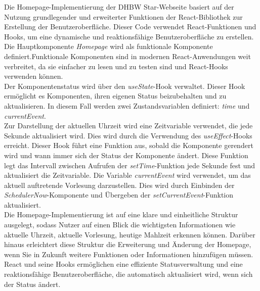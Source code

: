 Die Homepage-Implementierung der DHBW Star-Webseite basiert auf der Nutzung grundlegender und erweiterter Funktionen der React-Bibliothek zur Erstellung der Benutzeroberfläche. Dieser Code verwendet React-Funktionen und Hooks, um eine dynamische und reaktionsfähige Benutzeroberfläche zu erstellen.\\ 
Die Hauptkomponente \emph{Homepage} wird als funktionale Komponente definiert.Funktionale Komponenten sind in modernen React-Anwendungen weit verbreitet, da sie einfacher zu lesen und zu testen sind und React-Hooks verwenden können.\\
Der Komponentenstatus wird über den \emph{useState}-Hook verwaltet. Dieser Hook ermöglicht es Komponenten, ihren eigenen Status beizubehalten und zu aktualisieren. In diesem Fall werden zwei Zustandsvariablen definiert: \emph{time} und \emph{currentEvent}.\\
Zur Darstellung der aktuellen Uhrzeit wird eine Zeitvariable verwendet, die jede Sekunde aktualisiert wird. Dies wird durch die Verwendung des \emph{useEffect}-Hooks erreicht. Dieser Hook führt eine Funktion aus, sobald die Komponente gerendert wird und wann immer sich der Status der Komponente ändert. Diese Funktion legt das Intervall zwischen Aufrufen der \emph{setTime}-Funktion jede Sekunde fest und aktualisiert die Zeitvariable. Die Variable \emph{currentEvent} wird verwendet, um das aktuell auftretende Vorlesung darzustellen. Dies wird durch Einbinden der \emph{SchedulerNow}-Komponente  und Übergeben der \emph{setCurrentEvent}-Funktion aktualisiert.\\ 
Die Homepage-Implementierung ist auf eine klare und einheitliche Struktur ausgelegt, sodass Nutzer auf einen Blick die wichtigsten Informationen wie aktuelle Uhrzeit, aktuelle Vorlesung, heutige Mahlzeit erkennen können. Darüber hinaus erleichtert diese Struktur die Erweiterung und Änderung der Homepage, wenn Sie in Zukunft weitere Funktionen oder Informationen hinzufügen müssen. React und seine Hooks ermöglichen eine effiziente Statusverwaltung und eine reaktionsfähige Benutzeroberfläche, die  automatisch aktualisiert wird, wenn sich der Status ändert.

